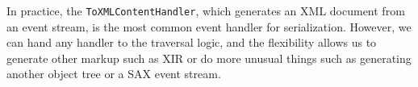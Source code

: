 In practice, the \lstinline'ToXMLContentHandler', which generates an
XML document from an event stream, is the most common event handler
for serialization.  However, we can hand any handler to the traversal
logic, and the flexibility allows us to generate other markup such as
XIR or do more unusual things such as generating another object tree
or a SAX event stream.


